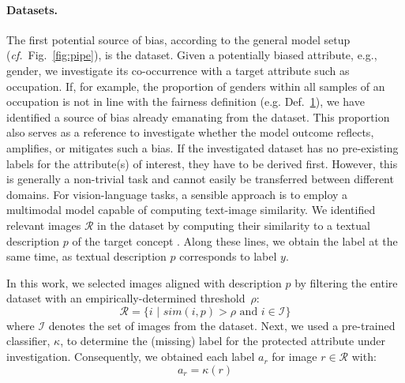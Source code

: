 \documentclass{article}%
\newcommand{\cf}{\emph{cf.}~}
\begin{document}
\paragraph{Datasets.}
The first potential source of bias, according to the general model setup (\cf Fig.~\ref{fig:pipe}), is the dataset. 
Given a potentially biased attribute, e.g., gender, we investigate its co-occurrence with a target attribute such as occupation. 
If, for example, the proportion of genders within all samples of an occupation is not in line with the fairness definition (e.g. Def.~\hyperref[def:fair1]{1}), we have identified a source of bias already emanating from the dataset. 
This proportion also serves as a reference to investigate whether the model outcome reflects, amplifies, or mitigates such a bias.
If the investigated dataset has no pre-existing labels for the attribute(s) of interest, they have to be derived first. 
However, this is generally a non-trivial task and cannot easily be transferred between different domains.
For vision-language tasks, a sensible approach is to employ a multimodal model capable of computing text-image similarity. We identified relevant images $\mathcal{R}$ in the dataset by computing their similarity to a textual description $p$ of the target concept \cite{radford2021learning}. Along these lines, we obtain the label at the same time, as textual description $p$ corresponds to label $y$.

In this work, we selected images aligned with description $p$ by filtering the entire dataset with an empirically-determined threshold~$\rho$:
\begin{equation}
    \mathcal{R} = \{i \,\, | \,\, sim(i, p) > \rho \,\, \text{and} \,\, i \in \mathcal{I} \}
\end{equation}
where $\mathcal{I}$ denotes the set of images from the dataset.
Next, we used a pre-trained classifier, $\kappa$, to determine the (missing) label for the protected attribute under investigation. Consequently, we obtained each label $a_r$ for image $r\in\mathcal{R}$ with:
\begin{equation}
    a_r = \kappa(r) 
    \label{eq:class_inp}
\end{equation}
\end{document}
